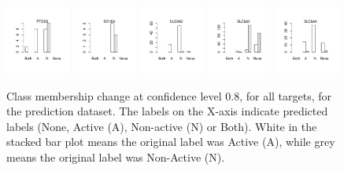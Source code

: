 \documentclass[utf8]{frontiersSCNS} %
\begin{document}
\begin{figure}[h!]
\includegraphics[width=0.19\textwidth]{figures/validation_plots/ptgs2_0p8_valplot.pdf}
\includegraphics[width=0.19\textwidth]{figures/validation_plots/scn5a_0p8_valplot.pdf}
\includegraphics[width=0.19\textwidth]{figures/validation_plots/slc6a2_0p8_valplot.pdf}
\includegraphics[width=0.19\textwidth]{figures/validation_plots/slc6a3_0p8_valplot.pdf}
\vspace*{-15pt} %
\includegraphics[width=0.19\textwidth]{figures/validation_plots/slc6a4_0p8_valplot.pdf}
    \caption{Class membership change at confidence level 0.8, for all targets,
    for the prediction dataset.
    The labels on the X-axis indicate predicted labels (None, Active (A),
    Non-active (N) or Both). White in the stacked bar plot means the
    original label was Active (A), while grey means the original label
    was Non-Active (N).
    }
    \label{fig:valplots_all_0.8}
\end{figure}
\end{document}
